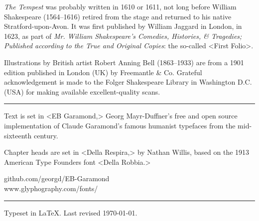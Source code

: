 \documentclass[
a5paper,
]{scrbook} %
\begin{document}
\cleardoubleevenpage
{}
\renewcommand\raggedsection{\centering} 
\vspace*{14em}
\centering
\enlargethispage{\baselineskip}

\begin{minipage}{\textwidth}
\textit{The Tempest} was probably written in 1610 or 1611, not long before William Shakespeare (1564--1616) retired from the stage and returned to his native Stratford-upon-Avon. It was first published by William Jaggard in London, in 1623, as part of \textit{Mr. William Shakespeare's Comedies, Histories, \& Tragedies; Published according to the True and Original Copies}: the so-called <First Folio>.

Illustrations by British artist Robert Anning Bell (1863--1933) are from a 1901 edition published in London (UK) by Freemantle \& Co. Grateful acknowledgement is made to the Folger Shakespeare Library in Washington D.C. (USA) for making available excellent-quality scans.
\end{minipage}

\vfill
\rule{0.5\textwidth}{.4pt}
\vfill
\begin{minipage}{\textwidth}
Text is set in <EB Garamond,> Georg Mayr-Duffner's free and open source implementation of Claude Garamond’s famous humanist typefaces from the mid-sixteenth century. 

Chapter heads are set in <Della Respira,> by Nathan Willis, based on the 1913 American Type Founders font <Della Robbia.>
\end{minipage}
\vfill
github.com/georgd/EB-Garamond\\www.glyphography.com/fonts/
\vfill
\rule{0.5\textwidth}{.4pt}
\vfill
Typeset in \LaTeX{}. Last revised \today.
\vfill
\thispagestyle{empty}
\end{document}
